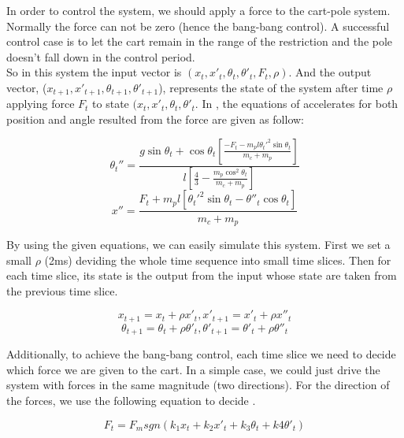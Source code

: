 \documentclass[11pt,twoside,a4paper]{article}
\begin{document}
In order to control the system, we should apply a force to the
cart-pole system. Normally the force can not be zero (hence the
bang-bang control). A successful control case is to let the cart
remain in the range of the restriction and the pole doesn't fall down
in the control period.\\

So in this system the input vector is $(x_t, x'_t, \theta_t, \theta '_t, F_t,
\rho)$. And the output vector, ($x_{t+1}, x'_{t+1}, \theta_{t+1},
\theta '_{t+1}$), represents the state of the system after time $\rho$
applying force $F_t$ to state $(x_t, x'_t, \theta_t, \theta '_t$. In
\cite{Brownlee2005}, the equations of accelerates for both position and
angle resulted from the force are given as follow:
\begin{center}
\begin{equation}\label{PH:theta2}
\theta_{t} '' = \frac{g \sin{\theta_t} +
  \cos{\theta_t}[\frac{-F_t-m_p l
    {\theta_t '}^2\sin{\theta_t}}{m_c+m_p}]}{l[\frac{4}{3}-\frac{m_p \cos^2{\theta_t}}{m_c+m_p}]}
\end{equation}
\begin{equation}\label{PH:x2}
x'' = \frac{F_t + m_p l [\theta_t '^2 \sin \theta_t - \theta''_t \cos \theta_t]}{m_c+m_p}
\end{equation}
\end{center}

By using the given equations, we can easily simulate this
system. First we set a small $\rho$ (2ms) deviding the whole time
sequence into small time slices. Then for each time slice, its state
is the output from the input whose state are taken from the previous
time slice.
\begin{center}
\begin{equation}\label{PH:x}
x_{t+1} = x_t + \rho x'_t, x'_{t+1} = x'_t + \rho x''_t
\end{equation}
\begin{equation}\label{PH:theta}
\theta_{t+1} = \theta_t + \rho \theta'_t, \theta'_{t+1} = \theta'_t + \rho \theta''_t
\end{equation}
\end{center}

Additionally, to achieve the bang-bang control, each time slice we
need to decide which force we are given to the cart. In a simple case,
we could just drive the system with forces in the same magnitude (two
directions). For the direction of the forces, we use the following
equation to decide \cite{Brownlee2005}.
\begin{center}
\begin{equation}\label{PH:bangbang}
F_t = F_m sgn (k_1 x_t + k_2 x'_t + k_3 \theta_t + k4 \theta'_t)
\end{equation}
\end{center}
\end{document}
